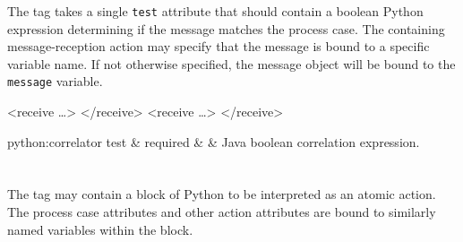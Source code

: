 The  tag takes a single \verb|test| attribute
that should contain a boolean Python expression determining if
the message matches the process case.  The containing message-reception
action may specify that the message is bound to a specific variable
name.  If not otherwise specified, the message object will be
bound to the \verb|message| variable. 

\begin{codelisting}
<receive \dots>
</receive>
<receive  \dots>
</receive>
\end{codelisting}

\begin{attrDefs}{python:correlator}
test		&	required	&			& Java boolean correlation expression. \\
\end{attrDefs}

\section{}

The  tag may contain a block of Python
to be interpreted as an atomic action.  The process case
attributes and other action attributes are bound to similarly
named variables within the block.

\begin{codelisting}
\end{codelisting}
